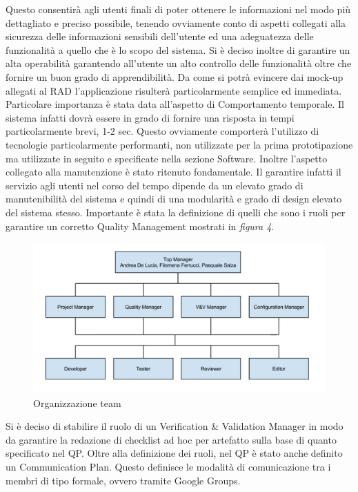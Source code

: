 Questo consentir\`{a} agli utenti finali di poter ottenere le informazioni nel modo pi\`{u} dettagliato e preciso possibile, tenendo ovviamente conto di aspetti collegati alla sicurezza delle informazioni sensibili dell\rq utente ed una adeguatezza delle funzionalit\`{a} a quello che \`{e} lo scopo del sistema.
Si \`{e} deciso inoltre di garantire un alta operabilit\`{a} garantendo all\rq utente un alto controllo delle funzionalit\`{a} oltre che fornire un buon grado di apprendibilit\`{a}.
Da come si potr\`{a} evincere dai mock-up allegati al RAD l\rq applicazione risulter\`{a} particolarmente semplice ed immediata.
Particolare importanza \`{e} stata data all\rq aspetto di Comportamento temporale. Il sistema infatti dovr\`{a} essere in grado di fornire una risposta in tempi particolarmente brevi, 1-2 sec.
Questo ovviamente comporter\`{a} l\rq utilizzo di tecnologie particolarmente performanti, non utilizzate per la prima prototipazione ma utilizzate in seguito e specificate nella sezione Software.
Inoltre l\rq aspetto collegato alla manutenzione \`{e} stato ritenuto fondamentale. Il garantire infatti il servizio agli utenti nel corso del tempo dipende da un elevato grado di manutenibilit\`{a} del sistema e quindi di una modularit\`{a} e grado di design elevato del sistema stesso.
Importante \`{e} stata la definizione di quelli che sono i ruoli per garantire un corretto Quality Management mostrati in \emph{figura 4}.
\begin{figure}[tp]
\centering
\includegraphics[scale=.7]{img/10.png}
\caption{Organizzazione team}
\label{fig:cd}
\end{figure}
Si \`{e} deciso di stabilire il ruolo di un Verification \& Validation Manager in modo da garantire la redazione di checklist ad hoc per artefatto sulla base di quanto specificato nel QP.
Oltre alla definizione dei ruoli, nel QP \`{e} stato anche definito un Communication Plan. Questo definisce le modalit\`{a} di comunicazione tra i membri di tipo formale, ovvero tramite Google Groups.
